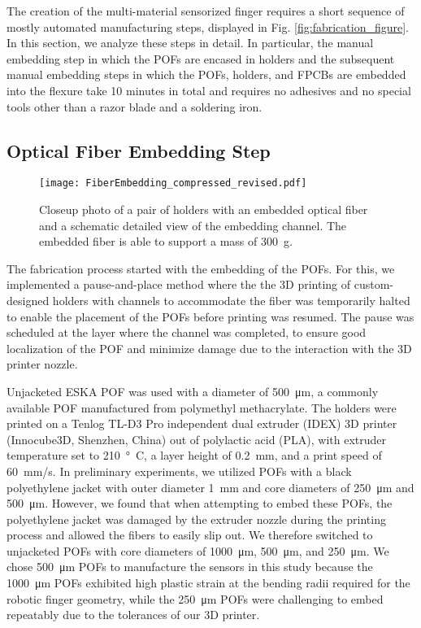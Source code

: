The creation of the multi-material sensorized finger requires a short sequence of mostly automated manufacturing steps, displayed in Fig.  \ref{fig:fabrication_figure}. In this section, we analyze these steps in detail. In particular, the manual embedding step in which the POFs are encased in holders and the subsequent manual embedding steps in which the POFs, holders, and FPCBs are embedded into the flexure take 10 minutes in total and requires no adhesives and no special tools other than a razor blade and a soldering iron. 
\subsection{Optical Fiber Embedding Step}
\begin{figure}
    \centering
    \texttt{[image: FiberEmbedding\_compressed\_revised.pdf]}
    \caption{Closeup photo of a pair of holders with an embedded optical fiber and a schematic detailed view of the embedding channel. The embedded fiber is able to support a mass of \qty{300}{\g}.}
    \label{fig:clearances_and_embed_closeups}
    \vspace{-1em}
\end{figure}

The fabrication process started with the embedding of the POFs. For this, we implemented a pause-and-place method where the the 3D printing of custom-designed holders with channels to accommodate the fiber was temporarily halted to enable the placement of the POFs before printing was resumed. The pause was scheduled at the layer where the channel was completed, to ensure good localization of the POF and minimize damage due to the interaction with the 3D printer nozzle.

Unjacketed ESKA POF was used with a diameter of \qty{500}{\um}, a commonly available POF manufactured from polymethyl methacrylate. The holders were printed on a Tenlog TL-D3 Pro independent dual extruder (IDEX) 3D printer (Innocube3D, Shenzhen, China) out of polylactic acid (PLA), with extruder temperature set to \qty{210}{\degree C}, a layer height of \qty{0.2}{\mm}, and a print speed of \qty{60}{\mm/s}. In preliminary experiments, we utilized POFs with a black polyethylene jacket with outer diameter \qty{1}{\mm} and core diameters of \qty{250}{\um} and \qty{500}{\um}. However, we found that when attempting to embed these POFs, the polyethylene jacket was damaged by the extruder nozzle during the printing process and allowed the fibers to easily slip out. We therefore switched to unjacketed POFs with core diameters of \qty{1000}{\um}, \qty{500}{\um}, and \qty{250}{\um}. We chose \qty{500}{\um} POFs to manufacture the sensors in this study because the \qty{1000}{\um} POFs exhibited high plastic strain at the bending radii required for the robotic finger geometry, while the \qty{250}{\um} POFs were challenging to embed repeatably due to the tolerances of our 3D printer.

